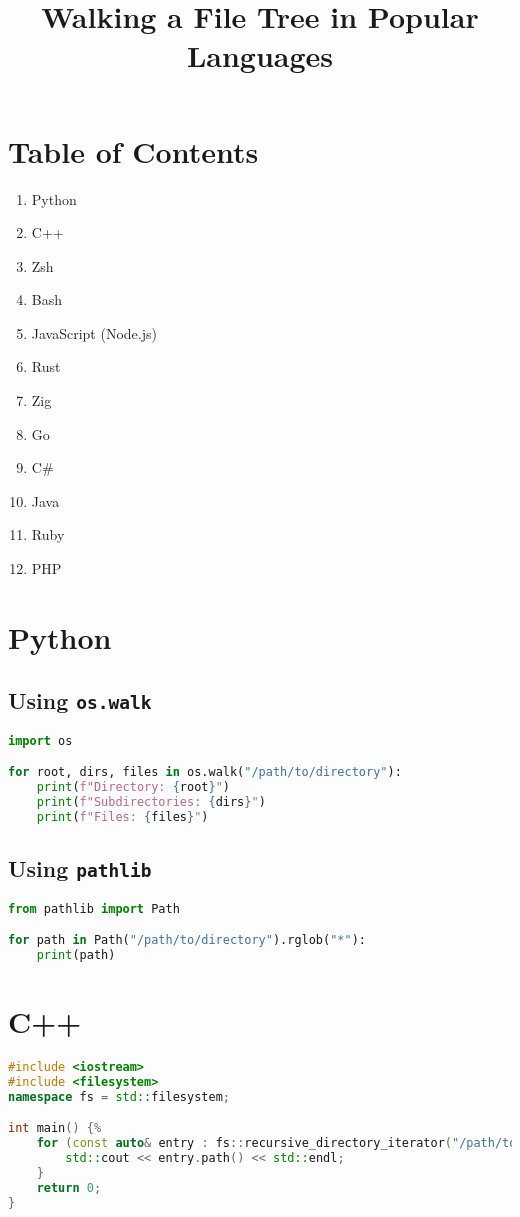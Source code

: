 \documentclass{article}
\title{Walking a File Tree in Popular Languages}
\author{}
\date{}
\begin{document}
\maketitle

\section*{Table of Contents}
\begin{enumerate}
    \item Python
    \item C++
    \item Zsh
    \item Bash
    \item JavaScript (Node.js)
    \item Rust
    \item Zig
    \item Go
    \item C\#
    \item Java
    \item Ruby
    \item PHP
\end{enumerate}

\newpage

\section{Python}
\subsection{Using \texttt{os.walk}}
\begin{lstlisting}[language=Python]
import os

for root, dirs, files in os.walk("/path/to/directory"):
    print(f"Directory: {root}")
    print(f"Subdirectories: {dirs}")
    print(f"Files: {files}")
\end{lstlisting}

\subsection{Using \texttt{pathlib}}
\begin{lstlisting}[language=Python]
from pathlib import Path

for path in Path("/path/to/directory").rglob("*"):
    print(path)
\end{lstlisting}

\section{C++}
\begin{lstlisting}[language=C++]
#include <iostream>
#include <filesystem>
namespace fs = std::filesystem;

int main() {%
    for (const auto& entry : fs::recursive_directory_iterator("/path/to/directory")) {%
        std::cout << entry.path() << std::endl;
    }
    return 0;
}
\end{lstlisting}
\end{document}
